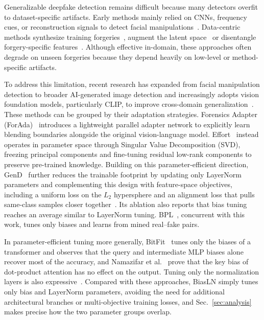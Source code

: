 \documentclass[fonts]{icst}
\newif\ifrevmark\revmarktrue
\newcommand{\rev}[1]{\ifrevmark{\color{revblue}#1}\else#1\fi}
\begin{document}
Generalizable deepfake detection remains difficult because many detectors overfit to dataset-specific artifacts. Early methods mainly relied on CNNs, frequency cues, or reconstruction signals to detect facial manipulations~\cite{rossler2019ff,qian2020frequency,luo2021srm,liu2021spsl,cao2022recce,badr2025wavit}. \rev{Data-centric methods synthesize training forgeries~\cite{shiohara2022sbi,chen2022sladd,lin2024cdfa}, augment the latent space~\cite{yan2024latent} or disentangle forgery-specific features~\cite{yan2023ucf,huang2023iid}.} Although effective in-domain, these approaches often degrade on unseen forgeries because they depend heavily on low-level or method-specific artifacts.

To address this limitation, recent research has expanded from facial manipulation detection to broader AI-generated image detection and increasingly adopts vision foundation models, particularly CLIP, to improve cross-domain generalization~\cite{ojha2023universal,cui2025forada,yan2025effort,yermakov2025gend}. These methods can be grouped by their adaptation strategies. \rev{Forensics Adapter (ForAda)}~\cite{cui2025forada} introduces a lightweight parallel adapter network to explicitly learn blending boundaries alongside the original vision-language model. Effort~\cite{yan2025effort} instead operates in parameter space through Singular Value Decomposition (SVD), freezing principal components and fine-tuning residual low-rank components to preserve pre-trained knowledge. Building on this parameter-efficient direction, GenD~\cite{yermakov2025gend} further reduces the trainable footprint by updating only LayerNorm parameters and complementing this design with feature-space objectives, including a uniform loss on the $L_2$ hypersphere and an alignment loss that pulls same-class samples closer together\rev{~\cite{wang2020alignment}. Its ablation also reports that bias tuning reaches an average similar to LayerNorm tuning. BPL~\cite{xu2026bpl}, concurrent with this work, tunes only biases and learns from mined real--fake pairs.}

\rev{In parameter-efficient tuning more generally, BitFit~\cite{benzaken2022bitfit} tunes only the biases of a transformer and observes that the query and intermediate MLP biases alone recover most of the accuracy, and Namazifar et al.~\cite{namazifar2023bias} prove that the key bias of dot-product attention has no effect on the output. Tuning only the normalization layers is also expressive~\cite{giannou2023layernorm,wang2022ln,valizadeh2024layernorm}.}
Compared with these approaches, BiasLN simply tunes only bias and LayerNorm parameters, avoiding the need for additional architectural branches or multi-objective training losses\rev{, and Sec.~\ref{sec:analysis} makes precise how the two parameter groups overlap.}
\end{document}
